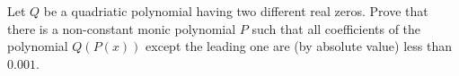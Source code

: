 Let $Q$ be a quadriatic polynomial having two different real zeros. Prove that there is a non-constant monic polynomial $P$ such that all coefficients of the polynomial $Q(P(x))$ except the leading one are (by absolute value) less than $0.001$.